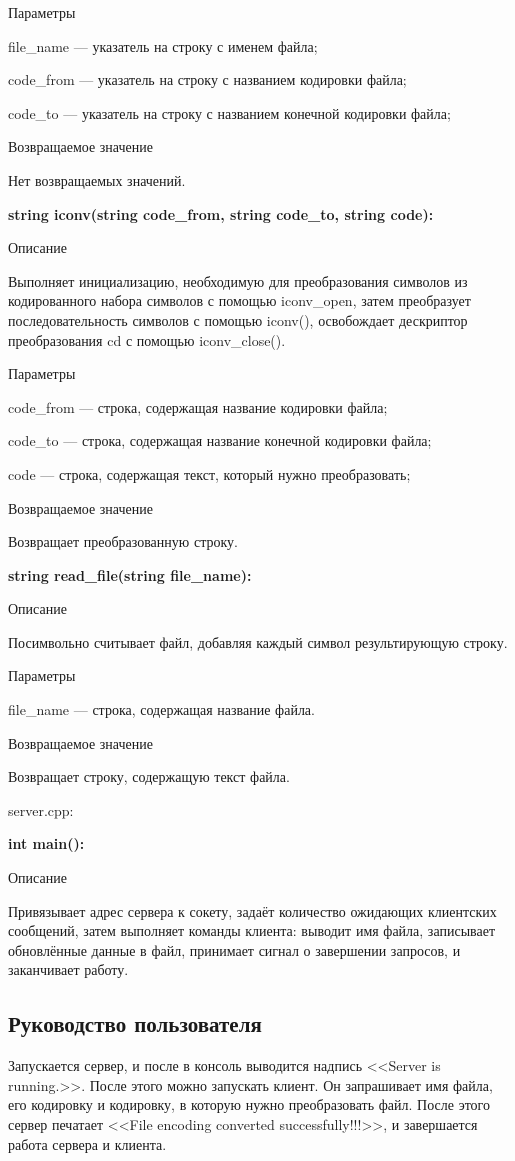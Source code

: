 \documentclass[a4paper,12pt]{extarticle}
\begin{document}
Параметры

file\_name --- указатель на строку с именем файла;

code\_from --- указатель на строку с названием кодировки файла;

code\_to --- указатель на строку с названием конечной кодировки файла;

Возвращаемое значение

Нет возвращаемых значений.

\textbf{string iconv(string code\_from, string code\_to, string code):}

Описание

Выполняет инициализацию, необходимую для преобразования символов из кодированного набора символов с помощью iconv\_open, затем преобразует последовательность символов с помощью iconv(), освобождает дескриптор преобразования cd с помощью iconv\_close().

Параметры

code\_from --- строка, содержащая название кодировки файла;

code\_to ---  строка, содержащая название конечной кодировки файла;

code --- строка, содержащая текст, который нужно преобразовать;

Возвращаемое значение

Возвращает преобразованную строку.

\textbf{string read\_file(string file\_name):}

Описание

Посимвольно считывает файл, добавляя каждый символ результирующую строку.

Параметры

file\_name --- строка, содержащая название файла.

Возвращаемое значение

Возвращает строку, содержащую текст файла.

server.cpp:

\textbf{int main():}

Описание

Привязывает адрес сервера к сокету, задаёт количество ожидающих клиентских сообщений, затем выполняет команды клиента: выводит имя файла, записывает обновлённые данные в файл, принимает сигнал о завершении запросов, и заканчивает работу.


\subsection{Руководство пользователя}
Запускается сервер, и после в консоль выводится надпись <<Server is running.>>. После этого можно запускать клиент. Он запрашивает имя файла, его кодировку и кодировку, в которую нужно преобразовать файл. После этого сервер печатает <<File encoding converted successfully!!!>>, и завершается работа сервера и клиента.
\end{document}
